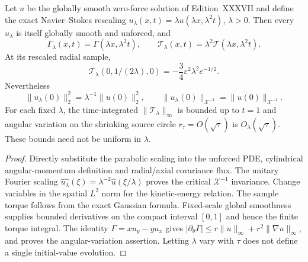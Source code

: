 \begin{theorem}
\label{thm:xxxviii-scaling}
Let $u$ be the globally smooth zero-force
solution of Edition~XXXVII and define the exact
Navier--Stokes rescaling
$u_\lambda(x,t)=\lambda u(\lambda x,\lambda^2t)$,
$\lambda>0$. Then every $u_\lambda$ is itself
globally smooth and unforced, and
\[
\boxed{\quad
\Gamma_\lambda(x,t)=\Gamma(\lambda x,\lambda^2t),
\qquad
\mathcal T_\lambda(x,t)=\lambda^2\mathcal T(\lambda x,\lambda^2t).
\quad}
\]
At its rescaled radial sample,
\begin{equation}\label{eq:xxxviii-instantaneous}
\boxed{\quad
\mathcal T_\lambda(0,1/(2\lambda),0)
=-\frac34\varepsilon^2\lambda^2e^{-1/2}.\quad}
\end{equation}
Nevertheless
\[
\boxed{\quad
\|u_\lambda(0)\|_2^2=\lambda^{-1}\|u(0)\|_2^2,
\qquad
\|u_\lambda(0)\|_{\mathcal X^{-1}}
=\|u(0)\|_{\mathcal X^{-1}}.\quad}
\]
For each fixed $\lambda$, the time-integrated
$\|\mathcal T_\lambda\|_\infty$ is bounded up to
$t=1$ and angular variation on the shrinking source
circle $r_\tau=O(\sqrt\tau)$ is $O_\lambda(\sqrt\tau)$.
These bounds need not be uniform in $\lambda$.
\end{theorem}
\begin{proof}
Directly substitute the parabolic scaling into the
unforced PDE, cylindrical angular-momentum definition
and radial/axial covariance flux. The unitary
Fourier scaling
$\widehat{u_\lambda}(\xi)=\lambda^{-2}
\widehat u(\xi/\lambda)$ proves the critical
$\mathcal X^{-1}$ invariance. Change variables
in the spatial $L^2$ norm for the kinetic-energy relation.
The sample torque follows from the exact Gaussian formula.
Fixed-scale global smoothness supplies bounded derivatives
on the compact interval $[0,1]$ and hence the finite
torque integral. The identity
$\Gamma=xu_y-yu_x$ gives
$|\partial_\theta\Gamma|
\le r\|u\|_\infty+r^2\|\nabla u\|_\infty$,
and proves the angular-variation assertion.
Letting $\lambda$ vary with $\tau$ does not define
a single initial-value evolution.
\end{proof}

